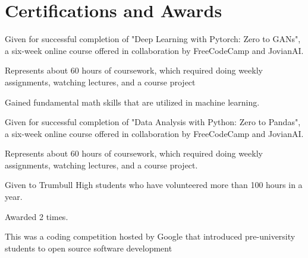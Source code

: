 \documentclass[]{resume-template}
\begin{document}
\begin{minipage}[t]{0.66\textwidth}

\section{Certifications and Awards}

\begin{tightemize}
\item Given for successful completion of "Deep Learning with Pytorch: Zero to GANs",
             a six-week online course offered in collaboration by FreeCodeCamp and JovianAI.
\item Represents about 60 hours of coursework, which required doing weekly assignments, watching lectures, and a course project
\item Gained fundamental math skills that are utilized in machine learning. 
\end{tightemize}
\sectionsep{}

\begin{tightemize}
\item Given for successful completion of "Data Analysis with Python: Zero to Pandas", 
            a six-week online course offered in collaboration by FreeCodeCamp and JovianAI.
\item Represents about 60 hours of coursework, which required doing weekly assignments, watching lectures, and a course project.
\end{tightemize}
\sectionsep{}

\begin{tightemize}
\item Given to Trumbull High students who have volunteered more than 100 hours in a year.
\item Awarded 2 times.
\end{tightemize}
\sectionsep{}

\begin{tightemize}
\item This was a coding competition hosted by Google that introduced pre-university students to open source software development
\end{tightemize}
\sectionsep{}





\end{minipage} 
\end{document}

